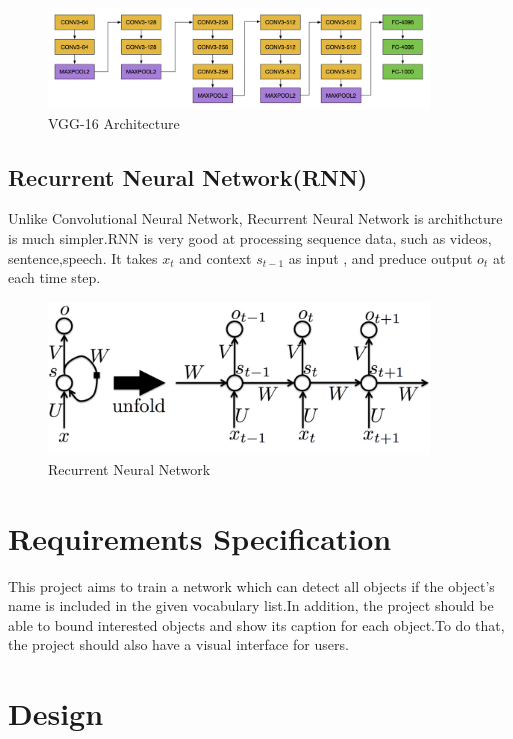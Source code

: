 \documentclass[12pt,a4paper]{report}
\begin{document}
\begin{itemize}
\begin{figure}[h]
\centering
\includegraphics[width=0.9\textwidth]{vgg16.png}
\caption{VGG-16 Architecture}
\end{figure}

\end{itemize}
\subsection{Recurrent Neural Network(RNN) \cite{rnn}}
Unlike Convolutional Neural Network, Recurrent Neural Network is archithcture is much simpler.RNN is very good at processing sequence data, such as videos, sentence,speech. It takes  $x_t$ and context $s_{t-1}$  as input , and preduce output  $o_t$ at each time step.

\begin{figure}[h]
\centering
\includegraphics[width=0.9\textwidth]{rnn1.png}
\caption{Recurrent Neural Network}
\end{figure}


\newpage
\section{Requirements Specification}
This project aims to train a network which can detect all objects if the object's name is included in the given vocabulary list.In addition, the project should be able to bound interested objects and show its caption for each object.To do that, the project should also have a visual interface for users.
\section{Design}
\end{document}
